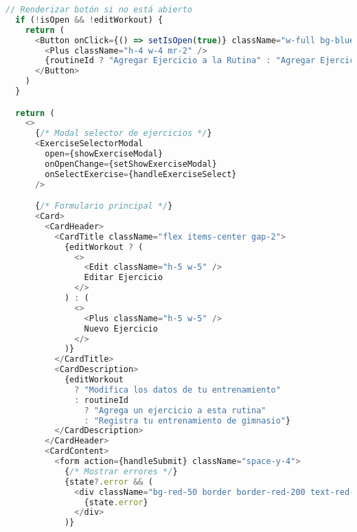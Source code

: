 \documentclass[12pt,a4paper]{article}
\begin{document}
\begin{lstlisting}[language=typescript, caption=components/gym/workout-form.tsx - Estructura principal]
  // Renderizar botón si no está abierto
  if (!isOpen && !editWorkout) {
    return (
      <Button onClick={() => setIsOpen(true)} className="w-full bg-blue-600 hover:bg-blue-700">
        <Plus className="h-4 w-4 mr-2" />
        {routineId ? "Agregar Ejercicio a la Rutina" : "Agregar Ejercicio"}
      </Button>
    )
  }

  return (
    <>
      {/* Modal selector de ejercicios */}
      <ExerciseSelectorModal
        open={showExerciseModal}
        onOpenChange={setShowExerciseModal}
        onSelectExercise={handleExerciseSelect}
      />

      {/* Formulario principal */}
      <Card>
        <CardHeader>
          <CardTitle className="flex items-center gap-2">
            {editWorkout ? (
              <>
                <Edit className="h-5 w-5" />
                Editar Ejercicio
              </>
            ) : (
              <>
                <Plus className="h-5 w-5" />
                Nuevo Ejercicio
              </>
            )}
          </CardTitle>
          <CardDescription>
            {editWorkout
              ? "Modifica los datos de tu entrenamiento"
              : routineId
                ? "Agrega un ejercicio a esta rutina"
                : "Registra tu entrenamiento de gimnasio"}
          </CardDescription>
        </CardHeader>
        <CardContent>
          <form action={handleSubmit} className="space-y-4">
            {/* Mostrar errores */}
            {state?.error && (
              <div className="bg-red-50 border border-red-200 text-red-700 px-4 py-3 rounded text-sm">
                {state.error}
              </div>
            )}


\end{lstlisting}
\end{document}
